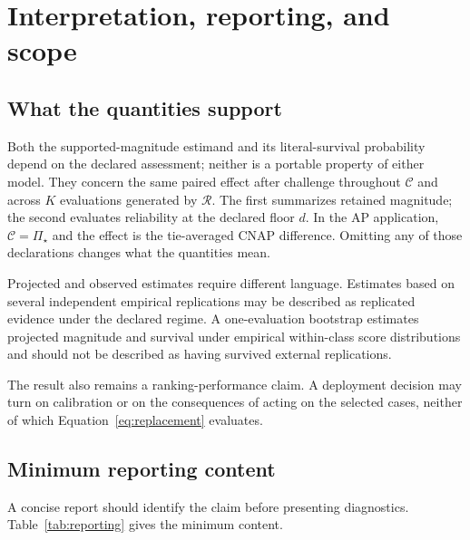 \documentclass[11pt]{article}
\newcommand{\Regime}{\mathcal{R}}
\newcommand{\CSet}{\mathcal{C}}
\newcommand{\PSet}{\Pi_\star}
\theoremstyle{remark}
\begin{document}
\section{Interpretation, reporting, and scope}
\label{sec:discussion}

\subsection{What the quantities support}

Both the supported-magnitude estimand and its literal-survival probability depend on the declared assessment; neither is a portable property of either model. They concern the same paired effect after challenge throughout $\CSet$ and across $K$ evaluations generated by $\Regime$. The first summarizes retained magnitude; the second evaluates reliability at the declared floor $d$. In the AP application, $\CSet=\PSet$ and the effect is the tie-averaged CNAP difference. Omitting any of those declarations changes what the quantities mean.

Projected and observed estimates require different language. Estimates based on several independent empirical replications may be described as replicated evidence under the declared regime. A one-evaluation bootstrap estimates projected magnitude and survival under empirical within-class score distributions and should not be described as having survived external replications.

The result also remains a ranking-performance claim. A deployment decision may turn on calibration or on the consequences of acting on the selected cases, neither of which Equation~\eqref{eq:replacement} evaluates.

\subsection{Minimum reporting content}

A concise report should identify the claim before presenting diagnostics. Table~\ref{tab:reporting} gives the minimum content.
\end{document}
